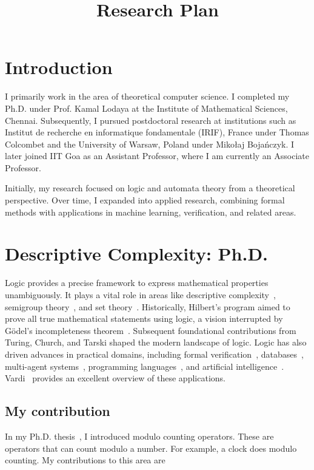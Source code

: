\documentclass[11pt]{article}
\title{Research Plan}
\author{}
\date{}
\begin{document}
\maketitle

\section{Introduction}
I primarily work in the area of theoretical computer science. I completed my Ph.D. under Prof. Kamal Lodaya at the Institute of Mathematical Sciences, Chennai. Subsequently, I pursued postdoctoral research at institutions such as Institut de recherche en informatique fondamentale (IRIF), France under Thomas Colcombet and the University of Warsaw, Poland under Mikołaj Boja\'nczyk. I later joined IIT Goa as an Assistant Professor, where I am currently an Associate Professor.

Initially, my research focused on logic and automata theory from a theoretical perspective. Over time, I expanded into applied research, combining formal methods with applications in machine learning, verification, and related areas.

\section{Descriptive Complexity: Ph.D.}
Logic provides a precise framework to express mathematical properties unambiguously. It plays a vital role in areas like descriptive complexity~\cite{immerman_book}, semigroup theory~\cite{str_cirBook}, and set theory~\cite{ject_setTheory}. Historically, Hilbert's program aimed to prove all true mathematical statements using logic, a vision interrupted by Gödel's incompleteness theorem~\cite{godel_incompleteness}. Subsequent foundational contributions from Turing, Church, and Tarski shaped the modern landscape of logic. Logic has also driven advances in practical domains, including formal verification~\cite{vardi94ic, esparza_unfoldings}, databases~\cite{vianu_bookDB}, multi-agent systems~\cite{vardi_logicEffectiveness}, programming languages~\cite{vardi_logicEffectiveness}, and artificial intelligence~\cite{nisson_logicAI}. Vardi~\cite{vardi_logicEffectiveness} provides an excellent overview of these applications.

\subsection{My contribution}
In my Ph.D. thesis~\cite{sav_thesis}, I introduced modulo counting operators. These are operators that can count modulo a number. For example, a clock does modulo counting. My contributions to this area are
\end{document}
